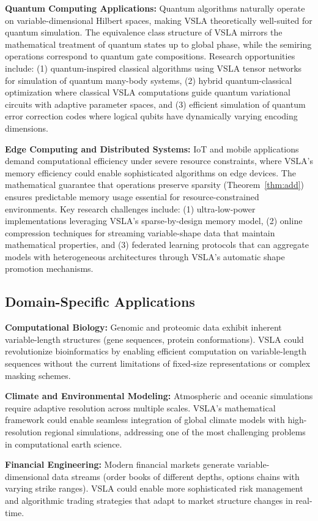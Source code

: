 \textbf{Quantum Computing Applications:} Quantum algorithms naturally operate on variable-dimensional Hilbert spaces, making VSLA theoretically well-suited for quantum simulation. The equivalence class structure of VSLA mirrors the mathematical treatment of quantum states up to global phase, while the semiring operations correspond to quantum gate compositions. Research opportunities include: (1) quantum-inspired classical algorithms using VSLA tensor networks for simulation of quantum many-body systems, (2) hybrid quantum-classical optimization where classical VSLA computations guide quantum variational circuits with adaptive parameter spaces, and (3) efficient simulation of quantum error correction codes where logical qubits have dynamically varying encoding dimensions.

\textbf{Edge Computing and Distributed Systems:} IoT and mobile applications demand computational efficiency under severe resource constraints, where VSLA's memory efficiency could enable sophisticated algorithms on edge devices. The mathematical guarantee that operations preserve sparsity (Theorem~\ref{thm:add}) ensures predictable memory usage essential for resource-constrained environments. Key research challenges include: (1) ultra-low-power implementations leveraging VSLA's sparse-by-design memory model, (2) online compression techniques for streaming variable-shape data that maintain mathematical properties, and (3) federated learning protocols that can aggregate models with heterogeneous architectures through VSLA's automatic shape promotion mechanisms.

\subsection{Domain-Specific Applications}

\textbf{Computational Biology:} Genomic and proteomic data exhibit inherent variable-length structures (gene sequences, protein conformations). VSLA could revolutionize bioinformatics by enabling efficient computation on variable-length sequences without the current limitations of fixed-size representations or complex masking schemes.

\textbf{Climate and Environmental Modeling:} Atmospheric and oceanic simulations require adaptive resolution across multiple scales. VSLA's mathematical framework could enable seamless integration of global climate models with high-resolution regional simulations, addressing one of the most challenging problems in computational earth science.

\textbf{Financial Engineering:} Modern financial markets generate variable-dimensional data streams (order books of different depths, options chains with varying strike ranges). VSLA could enable more sophisticated risk management and algorithmic trading strategies that adapt to market structure changes in real-time.
